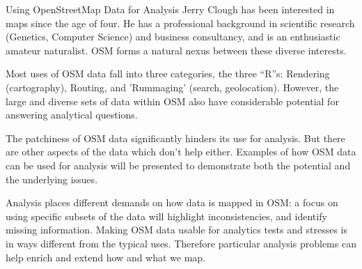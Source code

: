 %
{Using OpenStreetMap Data for Analysis}%
{Jerry Clough has been interested in maps since the age of four. He has a professional background in scientific research (Genetics, Computer Science) and business consultancy, and is an enthusiastic amateur naturalist. OSM forms a natural nexus between these diverse interests. }%
{Most uses of OSM data fall into three categories, the three ``R''s: Rendering (cartography), Routing, and 'Rummaging' (search, geolocation). However, the large and diverse sets of data within OSM also have considerable potential for answering analytical questions.

The patchiness of OSM data significantly hinders its use for analysis.  But there are other aspects of the data which don't help either. Examples of how OSM data can be used for analysis will be presented to demonstrate both the potential and the underlying issues.

Analysis places different demands on how data is mapped in OSM: a focus on using specific subsets of the data will highlight inconsistencies, and identify missing information. Making OSM data usable for analytics tests and stresses is in ways different from the typical uses. Therefore particular analysis problems can help enrich and extend how and what we map.}
